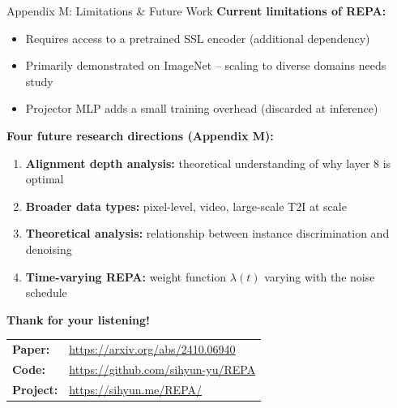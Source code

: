 \documentclass[aspectratio=169, 10pt]{beamer}
\begin{document}
\begin{frame}{Appendix M: Limitations \& Future Work}
\small
\textbf{Current limitations of REPA:}
\begin{itemize}\setlength{\itemsep}{2pt}
  \item Requires access to a pretrained SSL encoder (additional dependency)
  \item Primarily demonstrated on ImageNet -- scaling to diverse domains needs study
  \item Projector MLP adds a small training overhead (discarded at inference)
\end{itemize}

\vspace{0.5em}
\textbf{Four future research directions (Appendix M):}
\begin{enumerate}\setlength{\itemsep}{3pt}
  \item \textbf{Alignment depth analysis:} theoretical understanding of why layer 8 is optimal
  \item \textbf{Broader data types:} pixel-level, video, large-scale T2I at scale
  \item \textbf{Theoretical analysis:} relationship between instance discrimination and denoising
  \item \textbf{Time-varying REPA:} weight function $\lambda(t)$ varying with the noise schedule
\end{enumerate}
\end{frame}

\begin{frame}{}
\begin{center}
\vspace{2em}
{\Huge\textbf{Thank for your listening!}}

\vspace{1.5em}
{\large   }

\vspace{2em}
\begin{tabular}{ll}
  \textbf{Paper:} & \url{https://arxiv.org/abs/2410.06940} \\
  \textbf{Code:} & \url{https://github.com/sihyun-yu/REPA} \\
  \textbf{Project:} & \url{https://sihyun.me/REPA/}
\end{tabular}
\end{center}
\end{frame}
\end{document}
